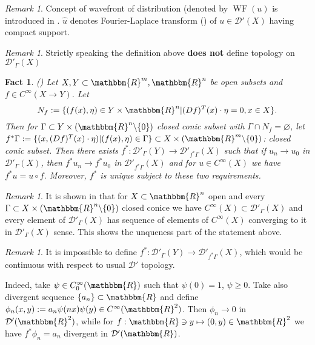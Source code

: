 \documentclass{article}
\newcommand{\assign}{:=}
\newcommand{\tmop}[1]{\ensuremath{\operatorname{#1}}}
\newcommand{\tmtextbf}[1]{{\bfseries{#1}}}
\newtheorem{fact}[proposition]{Fact}
\theoremstyle{remark}
\newtheorem{remark}[proposition]{Remark}
\begin{document}
\begin{remark}
  Concept of wavefront of distribution (denoted by $\tmop{WF} (u)$ is
  introduced in {\cite{hormander1983analysis}}. $\hat{u}$ denotes
  Fourier-Laplace transform ({\cite[sec. 7.1]{hormander1983analysis}}) of $u
  \in \mathcal{D}' (X)$ having compact support.
\end{remark}

\begin{remark}
  Strictly speaking the definition above \tmtextbf{does not} define topology
  on $\mathcal{D}'_{\Gamma} (X)$
\end{remark}

\begin{fact}
\label{holomorphicity-preserving:fact-pullback}({\cite[thm.
8.2.4]{hormander1983analysis}}) Let $X, Y \subset \mathbbm{R}^m,
\mathbbm{R}^n$ be open subsets and $f \in C^{\infty} (X \rightarrow Y)$. Let
\[ N_f \assign \{ (f (x), \eta) \in Y \times \mathbbm{R}^n | (D f)^T (x) \cdot
   \eta = 0, x \in X \} . \]
Then for $\Gamma \subset Y \times (\mathbbm{R}^n \backslash \{ 0 \})$ closed
conic subset with $\Gamma \cap N_f = \varnothing$, let $f^{\ast} \Gamma
\assign \{ (x, (D f)^T (x) \cdot \eta) | (f (x), \eta) \in \Gamma \} \subset X
\times (\mathbbm{R}^m \backslash \{ 0 \})$: closed conic subset. Then there
exists $f^{\ast} : \mathcal{D}'_{\Gamma} (Y) \rightarrow
\mathcal{D}'_{f^{\ast} \Gamma} (X)$ such that if $u_n \rightarrow u_0$ in
$\mathcal{D}'_{\Gamma} (X)$, then $f^{\ast} u_n \rightarrow f^{\ast} u_0$ in
$\mathcal{D}'_{f^{\ast} \Gamma} (X)$ and for $u \in C^{\infty} (X)$ we have
$f^{\ast} u = u \circ f$. Moreover, $f^{\ast}$ is unique subject to these two
requirements.
\end{fact}

\begin{remark}
  It is shown in {\cite[sec. 8.2]{hormander1983analysis}} that for $X \subset
  \mathbbm{R}^n$ open and every $\Gamma \subset X \times (\mathbbm{R}^n
  \backslash \{ 0 \})$ closed conice we have $C^{\infty} (X) \subset
  \mathcal{D}'_{\Gamma} (X)$ and every element of $\mathcal{D}'_{\Gamma} (X)$
  has sequence of elements of $C^{\infty} (X)$ converging to it in
  $\mathcal{D}'_{\Gamma} (X)$ sense. This shows the unqueness part of the
  statement above.
\end{remark}

\begin{remark}
  It is impossible to define $f^{\ast} : \mathcal{D}'_{\Gamma} (Y) \rightarrow
  \mathcal{D}'_{f^{\ast} \Gamma} (X)$, which would be continuous with respect
  to usual $\mathcal{D}'$ topology.
  
  Indeed, take $\psi \in C^{\infty}_0 (\mathbbm{R})$ such that $\psi (0) = 1$,
  $\psi \geqslant 0$. Take also divergent sequence $\{ a_n \} \subset
  \mathbbm{R}$ and define $\phi_n (x, y) \assign a_n \psi (n x) \psi (y) \in
  C^{\infty} (\mathbbm{R}^2)$. Then $\phi_n \rightarrow 0$ in $\mathcal{D}'
  (\mathbbm{R}^2)$, while for $f : \mathbbm{R} \ni y \mapsto (0, y) \in
  \mathbbm{R}^2$ we have $f^{\ast} \phi_n = a_n$ divergent in $\mathcal{D}'
  (\mathbbm{R})$.
\end{remark}
\end{document}
